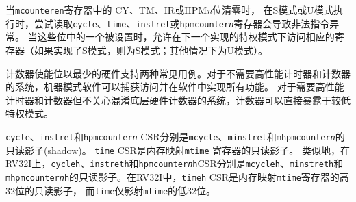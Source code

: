当{\tt mcounteren}寄存器中的 CY、TM、IR或HPM{\em n}位清零时，
在S模式或U模式执行时，尝试读取{\tt cycle}、{\tt time}、{\tt instret}或{\tt hpmcounter{\em n}}寄存器会导致非法指令异常。 
当这些位中的一个被设置时，允许在下一个实现的特权模式下访问相应的寄存器（如果实现了S模式，则为S模式；其他情况下为U模式）。

\iffalse
\begin{commentary}
The counter-enable bits support two common use cases with minimal hardware.
For systems that do not need high-performance timers and counters,
machine-mode software can trap accesses and implement all features in
software.  For systems that need high-performance timers and counters
but are not concerned with obfuscating the underlying hardware
counters, the counters can be directly exposed to lower privilege modes.
\end{commentary}
\fi

\begin{commentary}
计数器使能位以最少的硬件支持两种常见用例。对于不需要高性能计时器和计数器的系统，机器模式软件可以捕获访问并在软件中实现所有功能。 
对于需要高性能计时器和计数器但不关心混淆底层硬件计数器的系统，计数器可以直接暴露于较低特权模式。
\end{commentary}

\iffalse
The {\tt cycle}, {\tt instret}, and {\tt hpmcounter{\em n}} CSRs are
read-only shadows of {\tt mcycle}, {\tt minstret}, and {\tt mhpmcounter{\em
n}}, respectively.  The {\tt time} CSR is a read-only shadow of the
memory-mapped {\tt mtime} register.  Analogously, on RV32I the {\tt cycleh},
{\tt instreth} and {\tt hpmcounter{\em n}h} CSRs are read-only shadows of
{\tt mcycleh}, {\tt minstreth} and {\tt mhpmcounter{\em n}h}, respectively.
On RV32I the {\tt timeh} CSR is a read-only shadow of the upper 32 bits of
the memory-mapped {\tt mtime} register, while {\tt time} shadows only the
lower 32 bits of {\tt mtime}.
\fi

{\tt cycle}、{\tt instret}和{\tt hpmcounter{\em n}} CSR分别是{\tt mcycle}、{\tt minstret}和{\tt mhpmcounter{\em n}}的只读影子(shadow)。
{\tt time} CSR是内存映射{\tt mtime} 寄存器的只读影子。 
类似地，在RV32I上，{\tt cycleh}、{\tt instreth}和{\tt hpmcounter{\em n}h}CSR分别是{\tt mcycleh}、{\tt minstreth}和
{\tt mhpmcounter{\em n}h}的只读影子。在RV32I中，{\tt timeh} CSR是内存映射{\tt mtime}寄存器的高32位的只读影子，
而{\tt time}仅影射{\tt mtime}的低32位。

\iffalse
\begin{commentary}
Implementations can convert reads of the {\tt time} and {\tt timeh} CSRs
into loads to the memory-mapped {\tt mtime} register, or emulate this
functionality in M-mode software.
\end{commentary}
\fi

